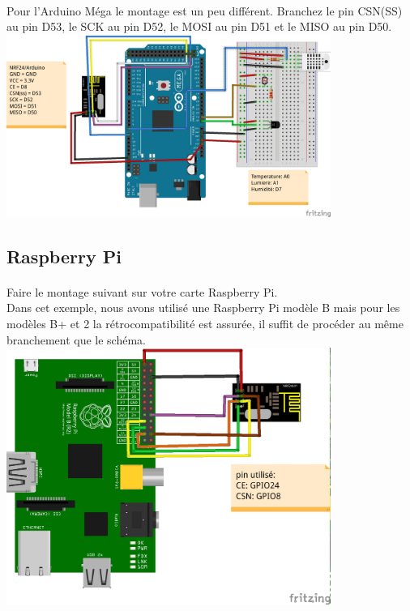 \documentclass[a4paper, titlepage, oneside, 12pt]{article}%
\begin{document}
\paragraph{}
Pour l'Arduino Méga le montage est un peu différent.
Branchez le pin CSN(SS) au pin D53, le SCK au pin D52, le MOSI au pin D51 et le MISO au pin D50.
\newline
\\
\includegraphics[width=400px] {montage-arduino-mega-nrF24.jpg}

\subsection{Raspberry Pi}
\paragraph{}
Faire le montage suivant sur votre carte Raspberry Pi.\\ Dans cet exemple, nous avons utilisé une Raspberry Pi modèle B mais pour les modèles B+ et 2 la rétrocompatibilité est assurée, il suffit de procéder au même branchement que le schéma.
\newline
\\
\includegraphics[width=400px] {montage-raspberry-nrF24.jpg}
\end{document}
